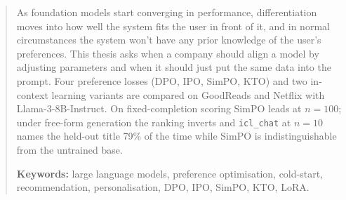 
\begin{abstract}
\noindent
As foundation models start converging in performance, differentiation moves into how well the system fits the user in front of it, and in normal circumstances the system won't have any prior knowledge of the user's preferences. This thesis asks when a company should align a model by adjusting parameters and when it should just put the same data into the prompt. Four preference losses (DPO, IPO, SimPO, KTO) and two in-context learning variants are compared on GoodReads and Netflix with Llama-3-8B-Instruct. On fixed-completion scoring SimPO leads at $n = 100$; under free-form generation the ranking inverts and \texttt{icl\_chat} at $n = 10$ names the held-out title 79\% of the time while SimPO is indistinguishable from the untrained base.

\vspace{1em}
\noindent\textbf{Keywords:} large language models, preference optimisation, cold-start, recommendation, personalisation, DPO, IPO, SimPO, KTO, LoRA.
\end{abstract}

